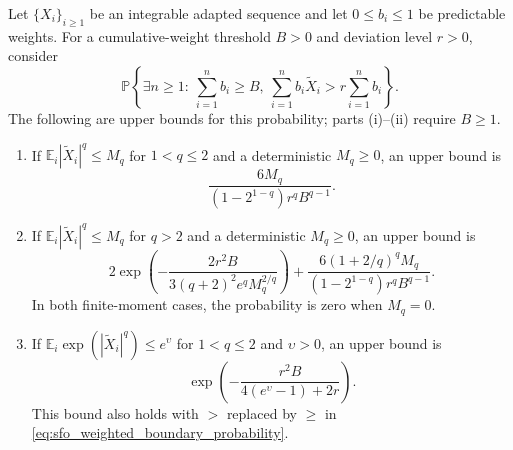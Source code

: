 \documentclass{article}
\begin{document}
\begin{corollary}
\label{lem:sfo_weighted_boundary}
Let \(\{X_i\}_{i\ge1}\) be an integrable adapted sequence and let
\(0\le b_i\le1\) be predictable weights. For a cumulative-weight
threshold \(B>0\) and deviation level \(r>0\), consider
\begin{equation}\label{eq:sfo_weighted_boundary_probability}
\textstyle\mathbb P\left\{\exists n\ge1:\
\sum_{i=1}^n b_i\ge B,\
\sum_{i=1}^n b_i\widetilde X_i>r\sum_{i=1}^n b_i\right\}.
\end{equation}
The following are upper bounds for this probability; parts
\textnormal{(i)}--\textnormal{(ii)} require \(B\ge1\).
\begin{enumerate}[label=\textnormal{(\roman*)},leftmargin=*]
\item If \(\mathbb E_i|\widetilde X_i|^q\le M_q\) for \(1<q\le2\)
and a deterministic \(M_q\ge0\), an upper bound is
\begin{equation}\label{eq:sfo_weighted_boundary_moment}
\frac{6M_q}{(1-2^{1-q})r^qB^{q-1}}.
\end{equation}
\item If \(\mathbb E_i|\widetilde X_i|^q\le M_q\) for \(q>2\)
and a deterministic \(M_q\ge0\), an upper bound is
\begin{equation}\label{eq:sfo_weighted_boundary_high_moment}
2\exp\!\left(-\frac{2r^2B}{3(q+2)^2e^qM_q^{2/q}}\right)
+\frac{6(1+2/q)^qM_q}{(1-2^{1-q})r^qB^{q-1}}.
\end{equation}
In both finite-moment cases, the probability is zero when \(M_q=0\).
\item If \(\mathbb E_i\exp(|\widetilde X_i|^q)\le e^\upsilon\) for
\(1<q\le2\) and \(\upsilon>0\), an upper bound is
\begin{equation}\label{eq:sfo_weighted_boundary_subweibull}
\exp\!\left(-\frac{r^2B}{4(e^\upsilon-1)+2r}\right).
\end{equation}
This bound also holds with \(>\) replaced by \(\ge\) in
\eqref{eq:sfo_weighted_boundary_probability}.
\end{enumerate}
\end{corollary}
\end{document}

